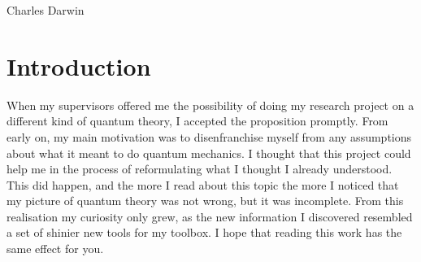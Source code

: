 \documentclass[10pt, a4paper, singlespacing, headsepline]{article}
\begin{document}
\vspace*{0.2\textheight}

\bigbreak

\hfill Charles Darwin

\vspace{20cm}


\tableofcontents %

\vspace{20cm}

\listoffigures %

\vspace{20cm}





\begin{abstract}
\blindtext
\end{abstract}

\section{Introduction}
When my supervisors offered me the possibility of doing my research project on a different kind of quantum theory, I accepted the proposition promptly. 
From early on, my main motivation was to disenfranchise myself from any assumptions about what it meant to do quantum mechanics. I thought that this project could help me in the process of reformulating what I thought I already understood. This did happen, and the more I read about this topic the more I noticed that my picture of quantum theory was not wrong, but it was incomplete. From this realisation my curiosity only grew, as the new information I discovered resembled a set of shinier new tools for my toolbox. I hope that reading this work has the same effect for you.
\end{document}
